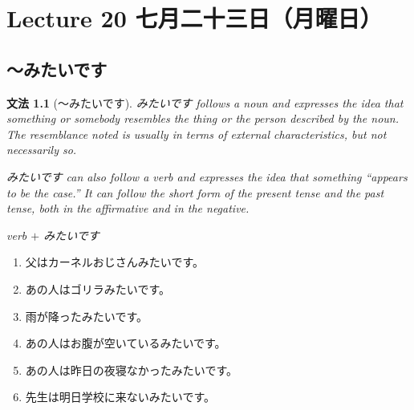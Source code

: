 \documentclass[notoc,notitlepage]{tufte-book}
\newtheorem{grammar}{\faBook \enspace 文法}[section]
\begin{document}


\chapter{Lecture 20 七月二十三日（月曜日）}%
\label{chp:lecture_20_qi_yue_er_shi_san_ri_yue_yao_ri_}

\section{〜みたいです}%
\label{sec:_mitaidesu}

\begin{grammar}[〜みたいです]
\label{grammar:_mitaidesu}
  みたいです follows a noun and expresses the idea that something or somebody \textit{resembles} the thing or the person described by the noun. The resemblance noted is usually in terms of external characteristics, but not necessarily so.

  みたいです can also follow a verb and expresses the idea that something ``appears to be the case.'' It can follow the short form of the present tense and the past tense, both in the affirmative and in the negative.

  \begin{center}
    verb $+$ みたいです
  \end{center}
\end{grammar}

\begin{eg}
  \begin{enumerate}
    \item 父はカーネルおじさんみたいです。
    \item あの人はゴリラみたいです。
    \item 雨が降ったみたいです。
    \item あの人はお腹が空いているみたいです。
    \item あの人は昨日の夜寝なかったみたいです。
    \item 先生は明日学校に来ないみたいです。
  \end{enumerate}
\end{eg}
\end{document}

